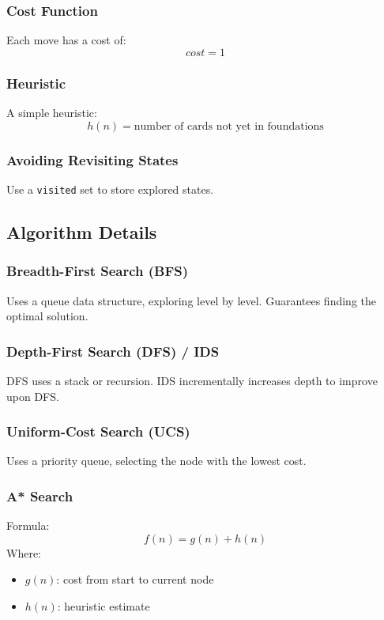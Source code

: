 \documentclass[12pt,a4paper]{article}
\begin{document}
\subsubsection{Cost Function}
Each move has a cost of:
\[
cost = 1
\]

\subsubsection{Heuristic}
A simple heuristic:
\[
h(n) = \text{number of cards not yet in foundations}
\]

\subsubsection{Avoiding Revisiting States}
Use a \texttt{visited} set to store explored states.

\subsection{Algorithm Details}

\subsubsection{Breadth-First Search (BFS)}
Uses a queue data structure, exploring level by level. 
Guarantees finding the optimal solution.

\subsubsection{Depth-First Search (DFS) / IDS}
DFS uses a stack or recursion. IDS incrementally increases depth to improve upon DFS.

\subsubsection{Uniform-Cost Search (UCS)}
Uses a priority queue, selecting the node with the lowest cost.

\subsubsection{A* Search}
Formula:
\[
f(n) = g(n) + h(n)
\]
Where:
\begin{itemize}
    \item $g(n)$: cost from start to current node
    \item $h(n)$: heuristic estimate
\end{itemize}
\end{document}
